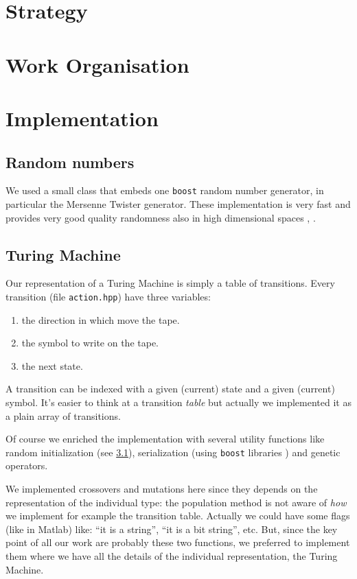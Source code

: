 \documentclass{report}
\begin{document}
\chapter{Strategy}
\label{chap:strategy}

\chapter{Work Organisation}
\label{chap:wo}

\chapter{Implementation}
\label{chap:impl}

\section{Random numbers}
\label{sec:random}
We used a small class that embeds one \texttt{boost} random number generator, in particular the Mersenne Twister generator. These implementation is very fast and provides very good quality randomness also in high dimensional spaces \cite{boost-random}, \cite{mersenne-twister}.

\section{Turing Machine}
Our representation of a Turing Machine is simply a table of transitions. Every transition (file \texttt{action.hpp}) have three variables:
\begin{enumerate}
\item the direction in which move the tape.
\item the symbol to write on the tape.
\item the next state.
\end{enumerate}
A transition can be indexed with a given (current) state and a given (current) symbol. It's easier to think at a transition \textit{table} but actually we implemented it as a plain array of transitions.

Of course we enriched the implementation with several utility functions like random initialization (see \ref{sec:random}), serialization (using \texttt{boost} libraries \cite{boost-serialization}) and genetic operators.

We implemented crossovers and mutations here since they depends on the representation of the individual type: the population method is not aware of \textit{how} we implement for example the transition table. Actually we could have some flags (like in Matlab) like: ``it is a string'', ``it is a bit string'', etc. But, since the key point of all our work are probably these two functions, we preferred to implement them where we have all the details of the individual representation, the Turing Machine.
\end{document}
